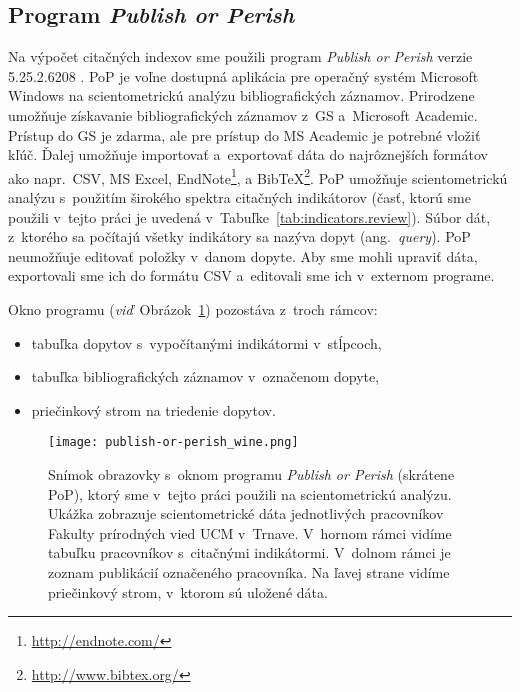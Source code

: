 \subsection{Program \emph{Publish or Perish}}
\label{sec:pop}

Na výpočet citačných indexov sme použili program \emph{Publish or Perish} verzie
5.25.2.6208 \citep{Harzing2011}.  PoP je voľne dostupná aplikácia pre operačný
systém Microsoft Windows na scientometrickú analýzu bibliografických záznamov.
Prirodzene umožňuje získavanie bibliografických záznamov z~GS a~Microsoft
Academic.  Prístup do GS je zdarma, ale pre prístup do MS Academic je potrebné
vložiť kľúč.  Ďalej umožňuje importovať a~exportovať dáta do najrôznejších
formátov ako napr.~CSV, MS Excel, EndNote\footnote{\url{http://endnote.com/}},
a BibTeX\footnote{\url{http://www.bibtex.org/}}.  PoP umožňuje scientometrickú
analýzu s~použitím širokého spektra citačných indikátorov (časť, ktorú sme
použili v~tejto práci je uvedená v~Tabuľke~\ref{tab:indicators.review}).  Súbor
dát, z~ktorého sa počítajú všetky indikátory sa nazýva dopyt
(ang.~\emph{query}).  PoP neumožňuje editovať položky v~danom dopyte.  Aby sme
mohli upraviť dáta, exportovali sme ich do formátu CSV a~editovali sme ich
v~externom programe.

Okno programu (\emph{viď}~Obrázok~\ref{fig:pop.screenshot}) pozostáva z~troch
rámcov:
\begin{itemize}
\item tabuľka dopytov s~vypočítanými indikátormi v~stĺpcoch,
\item tabuľka bibliografických záznamov v~označenom dopyte,
\item priečinkový strom na triedenie dopytov.
\end{itemize}

\begin{figure}
  \centering
  \texttt{[image: publish-or-perish\_wine.png]}
  \caption[Snímok obrazovky s~oknom programu \emph{Publish or Perish}]%
  {Snímok obrazovky s~oknom programu \emph{Publish or Perish} (skrátene PoP),
    ktorý sme v~tejto práci použili na scientometrickú analýzu.  Ukážka
    zobrazuje scientometrické dáta jednotlivých pracovníkov Fakulty prírodných
    vied UCM v~Trnave.  V~hornom rámci vidíme tabuľku pracovníkov s~citačnými
    indikátormi.  V~dolnom rámci je zoznam publikácií označeného pracovníka.  Na
    ľavej strane vidíme priečinkový strom, v~ktorom sú uložené dáta.}
  \label{fig:pop.screenshot}
\end{figure}


